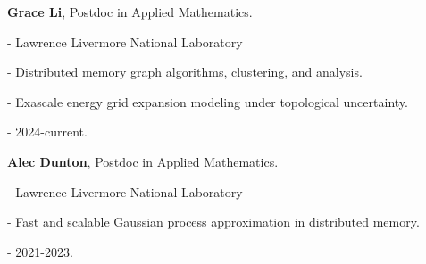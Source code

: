 \begin{innerlist}

  \item[] \textbf{Grace Li},
  Postdoc in Applied Mathematics.
  \begin{innerlist}
    \item[-] Lawrence Livermore National Laboratory
    \item[-] Distributed memory graph algorithms, clustering, and analysis.
    \item[-] Exascale energy grid expansion modeling under topological uncertainty.
    \item[-] 2024-current.
  \end{innerlist}

  \item[] \textbf{Alec Dunton},
  Postdoc in Applied Mathematics.
  \begin{innerlist}
    \item[-] Lawrence Livermore National Laboratory
    \item[-] Fast and scalable Gaussian process approximation in distributed memory.
    \item[-] 2021-2023.
  \end{innerlist}

\end{innerlist}
